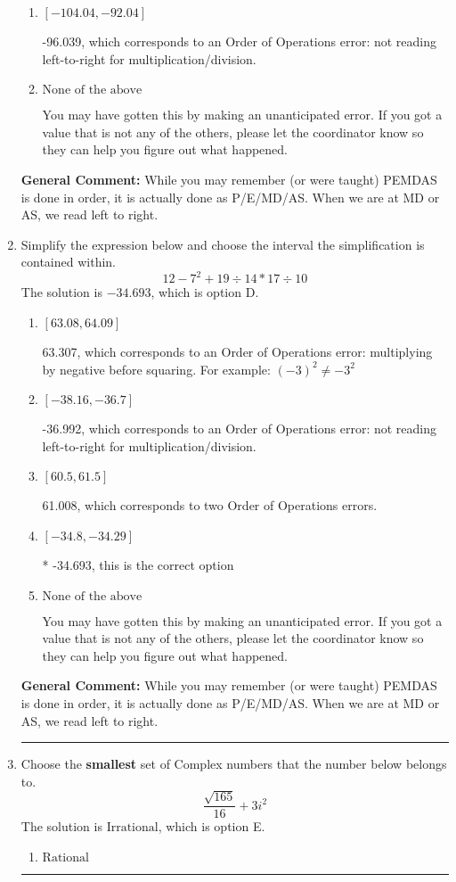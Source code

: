 \documentclass{extbook}[14pt]
\newcommand{\litem}[1]{\item #1

\rule{\textwidth}{0.4pt}}
\begin{document}
\begin{enumerate}
{\begin{enumerate}[label=\Alph*.]
* -104.824, which is the correct option.
\item \( [-104.04, -92.04] \)

 -96.039, which corresponds to an Order of Operations error: not reading left-to-right for multiplication/division.
\item \( \text{None of the above} \)

 You may have gotten this by making an unanticipated error. If you got a value that is not any of the others, please let the coordinator know so they can help you figure out what happened.
\end{enumerate}

\textbf{General Comment:} While you may remember (or were taught) PEMDAS is done in order, it is actually done as P/E/MD/AS. When we are at MD or AS, we read left to right.
}
\litem{
Simplify the expression below and choose the interval the simplification is contained within.
\[ 12 - 7^2 + 19 \div 14 * 17 \div 10 \]The solution is \( -34.693 \), which is option D.\begin{enumerate}[label=\Alph*.]
\item \( [63.08, 64.09] \)

 63.307, which corresponds to an Order of Operations error: multiplying by negative before squaring. For example: $(-3)^2 \neq -3^2$
\item \( [-38.16, -36.7] \)

 -36.992, which corresponds to an Order of Operations error: not reading left-to-right for multiplication/division.
\item \( [60.5, 61.5] \)

 61.008, which corresponds to two Order of Operations errors.
\item \( [-34.8, -34.29] \)

* -34.693, this is the correct option
\item \( \text{None of the above} \)

 You may have gotten this by making an unanticipated error. If you got a value that is not any of the others, please let the coordinator know so they can help you figure out what happened.
\end{enumerate}

\textbf{General Comment:} While you may remember (or were taught) PEMDAS is done in order, it is actually done as P/E/MD/AS. When we are at MD or AS, we read left to right.
}
\litem{
Choose the \textbf{smallest} set of Complex numbers that the number below belongs to.
\[ \frac{\sqrt{165}}{16}+3i^2 \]The solution is \( \text{Irrational} \), which is option E.\begin{enumerate}[label=\Alph*.]
\item \( \text{Rational} \)


\end{enumerate}}
\end{enumerate}
\end{document}
